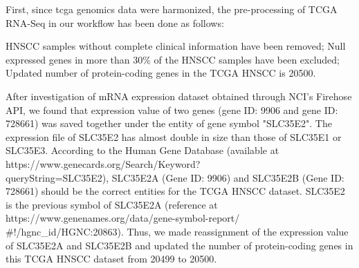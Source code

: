\documentclass[preprint,12pt]{elsarticle}
\newenvironment{MyIndent}
{\par\leftskip1cm\relax\rightskip1cm\relax}
{\par\leftskip0cm\relax\rightskip0cm\relax}
\newenvironment{MyColorPar}[1]{%
    \leavevmode\color{#1}\ignorespaces%
}{%
}%
\begin{document}
\begin{MyColorPar}{blue}
\begin{MyIndent}
\begin{MyColorPar}{red}
First, since \acrshort{tcga} genomics data were harmonized, 
the pre-processing of TCGA RNA-Seq in our workflow has been done as follows: 
\begin{outline}
\1 HNSCC samples without complete clinical information have been removed;
\1 Null expressed genes in more than 30\% of the HNSCC samples have been excluded; %
\1 Updated number of protein-coding genes in the TCGA HNSCC is 20500.
\end{outline}
After investigation of mRNA expression dataset obtained through NCI's Firehose API, we found that expression value of two genes (gene ID: 9906 and gene ID: 728661) was saved together under the entity of gene symbol "SLC35E2".
The expression file of SLC35E2 has almost double in size than those of SLC35E1 or SLC35E3.
According to the Human Gene Database (available at https://www.genecards.org/Search/Keyword?\\queryString=SLC35E2), SLC35E2A (Gene ID: 9906) and SLC35E2B (Gene ID: 728661) should be the correct entities for the TCGA HNSCC dataset.
SLC35E2 is the previous symbol of SLC35E2A (reference at https://www.genenames.org/data/gene-symbol-report/\\\#!/hgnc\_id/HGNC:20863).
Thus, we made reassignment of the expression value of SLC35E2A and SLC35E2B and updated the number of protein-coding genes in this TCGA HNSCC dataset from 20499 to 20500.





\end{MyColorPar}
\end{MyIndent}
\end{MyColorPar}
\end{document}
